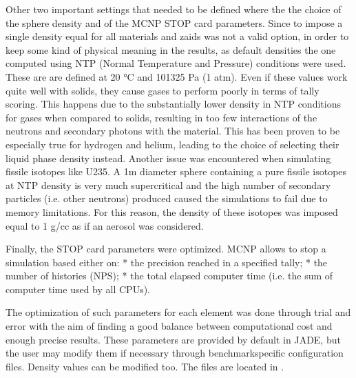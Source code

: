 \documentclass[letterpaper,10pt,english]{sphinxmanual}
\begin{document}
Other two important settings that needed to be defined where the the choice of the sphere density
and of the MCNP STOP card parameters. Since to impose a
single density equal for all materials and  zaids was not a valid option, in order to keep some
kind of physical meaning in the results, as default densities the one computed using NTP
(Normal Temperature and Pressure) conditions were used. These are are defined at 20 °C and
101325 Pa (1 atm). Even if these values work quite well with solids, they cause gases to perform
poorly in terms of tally scoring. This happens due to the substantially lower density in NTP conditions
for gases when compared to solids, resulting in too few interactions of the neutrons and secondary photons
with the material. This has been proven to be especially true for hydrogen and helium, leading to the
choice of selecting their liquid phase density instead. Another issue was encountered when simulating
fissile isotopes like U235. A 1m diameter sphere containing a pure fissile isotopes at NTP density is
very much super\sphinxhyphen{}critical and the high number of secondary particles (i.e. other neutrons) produced
caused the simulations to fail due to memory limitations. For this reason, the density of these isotopes
was imposed equal to 1 g/cc as if an aerosol was considered.

Finally, the STOP card parameters were optimized. MCNP allows to stop a simulation based either on:
* the precision reached in a specified tally;
* the number of histories (NPS);
* the total elapsed computer time (i.e. the sum of computer time used by all CPUs).

The optimization of such parameters for each element was done through trial and error with the aim of
finding a good balance between computational cost and enough precise results.
These parameters are provided by default in JADE, but the user may modify them if necessary through
benchmark\sphinxhyphen{}specific configuration files. Density values can be modified too. The files are located in
.
\end{document}
